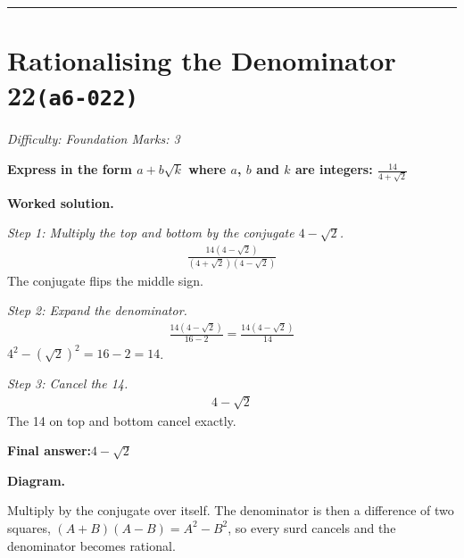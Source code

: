 \documentclass[11pt]{article}
\newcommand{\question}[1]{\par\medskip\noindent\textbf{#1}\par}
\begin{document}
\medskip\hrule

\section*{Rationalising the Denominator 22\quad\small\texttt{(a6-022)}}
\textit{Difficulty: Foundation \quad\textbar\quad Marks: 3}

\question{Express in the form \( a + b\sqrt{k} \) where \( a \), \( b \) and \( k \) are integers: \( \frac{14}{4 + \sqrt{2}} \)}

\textbf{Worked solution.}

\textit{Step 1: Multiply the top and bottom by the conjugate \( 4 - \sqrt{2} \).}
\[\begin{gathered}
\frac{14(4 - \sqrt{2})}{(4 + \sqrt{2})(4 - \sqrt{2})}
\end{gathered}\]
The conjugate flips the middle sign.

\textit{Step 2: Expand the denominator.}
\[\begin{gathered}
\frac{14(4 - \sqrt{2})}{16 - 2} = \frac{14(4 - \sqrt{2})}{14}
\end{gathered}\]
\( 4^2 - (\sqrt{2})^2 = 16 - 2 = 14 \).

\textit{Step 3: Cancel the 14.}
\[\begin{gathered}
4 - \sqrt{2}
\end{gathered}\]
The 14 on top and bottom cancel exactly.

\begin{answerbox}
\textbf{Final answer:}\quad \(\displaystyle 4 - \sqrt{2}\)
\end{answerbox}
\textbf{Diagram.}

\begin{center}
\end{center}
\small Multiply by the conjugate over itself. The denominator is then a difference of two squares, $(A+B)(A-B)=A^{2}-B^{2}$, so every surd cancels and the denominator becomes rational.\normalsize
\end{document}
